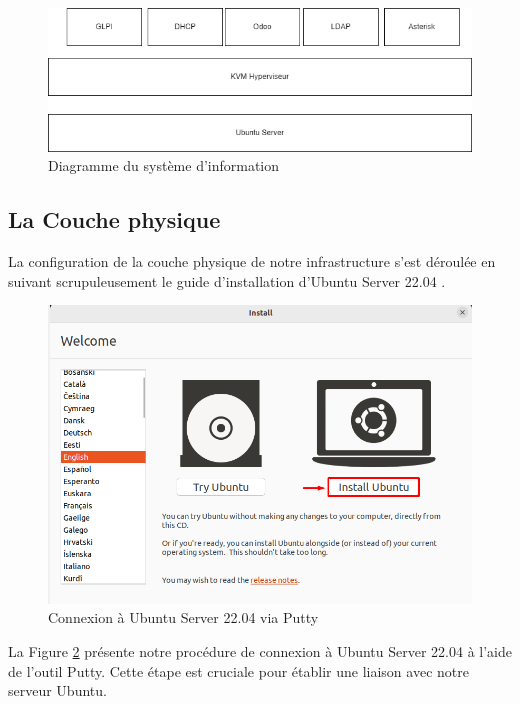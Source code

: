 \begin{figure}[H]
\centering
\includegraphics[width=16cm]{Images/diagsi.png}
\caption{Diagramme du système d'information}
\label{fig:diagramme-SI}
\end{figure}






\subsection{La Couche physique}

La configuration de la couche physique de notre infrastructure s'est déroulée en suivant scrupuleusement le guide d'installation d'Ubuntu Server 22.04 \cite{linuxgenie_ubuntu2204}. 

\begin{figure}[H]
  \centering
  \includegraphics[width=15cm]{Images/ubuntu-install.png}
  \caption{Connexion à Ubuntu Server 22.04 via Putty}
  \label{fig:ubuntu-install}
\end{figure}

La Figure \ref{fig:ubuntu-install} présente notre procédure de connexion à Ubuntu Server 22.04 à l'aide de l'outil Putty. Cette étape est cruciale pour établir une liaison avec notre serveur Ubuntu.

